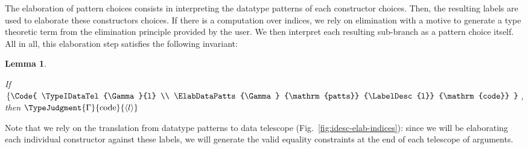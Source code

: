 \documentclass{scrartcl}
\theoremstyle{plain}
\newtheorem{lemma}{Lemma}
\theoremstyle{definition}
\begin{document}
The elaboration of pattern choices consists in interpreting the
datatype patterns of each constructor choices. Then, the resulting
labels are used to elaborate these constructors choices. If there is a
computation over indices, we rely on elimination with a motive
\citep{mcbride:elim-2,mcbride:elim} to generate a type theoretic term
from the elimination principle provided by the user. We then interpret
each resulting sub-branch as a pattern choice itself. All in all, this
elaboration step satisfies the following invariant:
\begin{lemma}\label{lemma:idesc-elab-datapatts}

If 
\(\left\{\Code{
\TypeIDataTel{\Gamma}{l} \\
\ElabDataPatts{\Gamma}
                     {\mathrm{patts}}
                     {\LabelDesc{l}}
                     {\mathrm{code}}
}\right.\), then
\(
\TypeJudgment{\Gamma}{\mathrm{code}}{\LabelDesc{l}}
\)

\end{lemma}

Note that we rely on the translation from datatype patterns to data
telescope (Fig.~\ref{fig:idesc-elab-indices}): since we will be
elaborating each individual constructor against these labels, we will
generate the valid equality constraints at the end of each telescope
of arguments.
\end{document}
